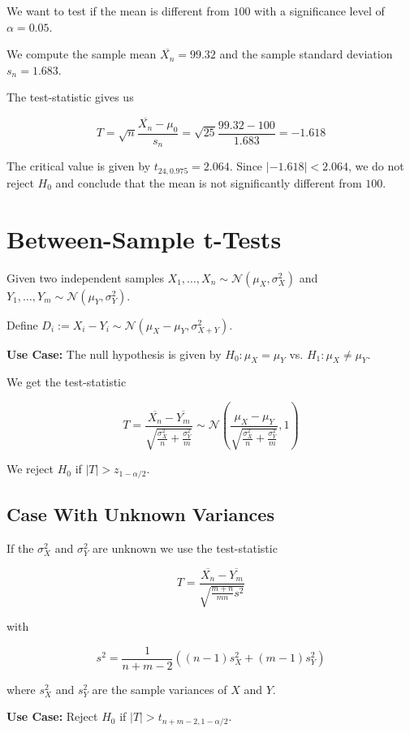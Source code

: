 We want to test if the mean is different from \(100\) with a significance level of \(\alpha = 0.05\).

We compute the sample mean \(\overline{X_n} = 99.32\) and the sample standard deviation \(s_n = 1.683\).

The test-statistic gives us

\[
    T = \sqrt{n} \frac{\overline{X_n} - \mu_0}{s_n} = \sqrt{25} \frac{99.32 - 100}{1.683} = -1.618
\]

The critical value is given by \(t_{24, 0.975} = 2.064\). Since \(|-1.618| < 2.064\), we do not reject \(H_0\) and conclude that the mean is 
not significantly different from \(100\).

\section{Between-Sample t-Tests}

Given two independent samples \(X_1, \dots, X_n \sim \mathcal{N}(\mu_X, \sigma_X^2)\) and 
\(Y_1, \dots, Y_m \sim \mathcal{N}(\mu_Y, \sigma_Y^2)\). 

Define \(D_i := X_i - Y_i \sim \mathcal{N}(\mu_X - \mu_Y, \sigma_{X + Y}^{2})\).

\textbf{Use Case:} The null hypothesis is given by \(H_0: \mu_X = \mu_Y\) vs. \(H_1: \mu_X \ne \mu_Y\).

We get the test-statistic 

\[
    T = \frac{\overline{X_n} - \overline{Y_m}}{\sqrt{\frac{\sigma_X^2}{n} + \frac{\sigma_Y^2}{m}}} 
    \sim \mathcal{N} \left( \frac{\mu_X - \mu_Y}{\sqrt{\frac{\sigma_X^2}{n} + \frac{\sigma_Y^2}{m}}}, 1 \right) 
\]

We reject \(H_0\) if \(|T| > z_{1 - \alpha/2}\). 

\subsection{Case With Unknown Variances}

If the \(\sigma_X^2\) and \(\sigma_Y^2\) are unknown we use the test-statistic 

\[
    T = \frac{\overline{X_n} - \overline{Y_m}}{\sqrt{\frac{m + n}{mn}s^2}}
\]

with 

\[
    s^2 = \frac{1}{n + m - 2}((n -1)s_X^2 + (m - 1)s_Y^2)
\]

where \(s_X^2\) and \(s_Y^2\) are the sample variances of \(X\) and \(Y\).

\textbf{Use Case:} Reject \(H_0\) if \(|T| > t_{n + m - 2, 1 - \alpha/2}\).

